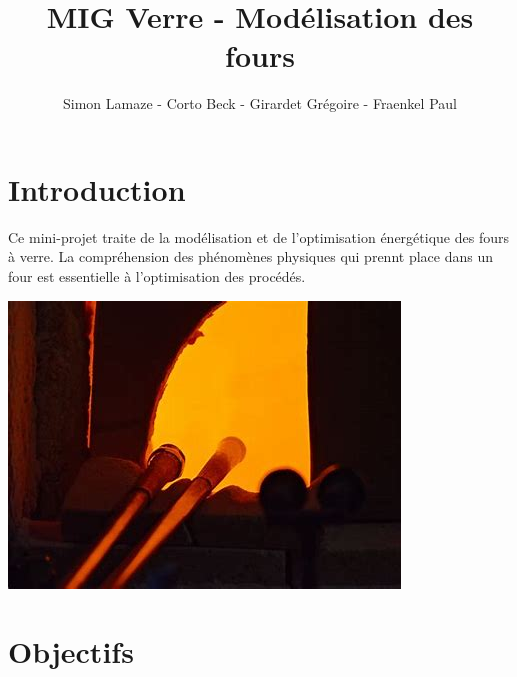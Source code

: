 \documentclass[12pt, a4paper, french, BCOR = 0pt, DIV = 10]{scrartcl}
\title{MIG Verre - Modélisation des fours}
\author{\small{Simon Lamaze - Corto Beck - Girardet Grégoire - Fraenkel Paul}}
\begin{document}
    \maketitle
    \tableofcontents
    
    \section{Introduction}
    Ce mini-projet traite de la modélisation et de l'optimisation énergétique des fours à verre.  La compréhension des phénomènes physiques qui prennt place dans un four est essentielle à l'optimisation des procédés.
    \begin{center}
        \includegraphics[width=\linewidth]{ImageIllustration.jpeg}
    \end{center}
    

    \section{Objectifs}
\end{document}
